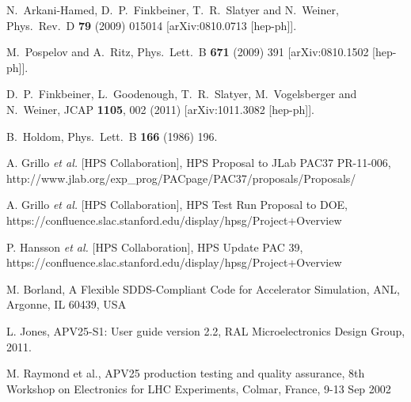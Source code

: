 \begin{thebibliography}{999}

N.~Arkani-Hamed, D.~P.~Finkbeiner, T.~R.~Slatyer and N.~Weiner,
Phys.\ Rev.\ D {\bf 79} (2009) 015014
[arXiv:0810.0713 [hep-ph]].


M.~Pospelov and A.~Ritz,
Phys.\ Lett.\ B {\bf 671} (2009) 391
[arXiv:0810.1502 [hep-ph]].

  D.~P.~Finkbeiner, L.~Goodenough, T.~R.~Slatyer, M.~Vogelsberger and N.~Weiner,
  JCAP {\bf 1105}, 002 (2011)
  [arXiv:1011.3082 [hep-ph]].

B.~Holdom,
Phys.\ Lett.\ B {\bf 166} (1986) 196.


 A. Grillo {\it et al.} [HPS Collaboration], HPS Proposal to JLab PAC37 PR-11-006,
 http://www.jlab.org/exp\_prog/PACpage/PAC37/proposals/Proposals/

 A. Grillo {\it et al.} [HPS Collaboration], HPS Test Run Proposal to DOE, 
https://confluence.slac.stanford.edu/display/hpsg/Project+Overview

 P. Hansson {\it et al.} [HPS Collaboration], HPS Update PAC 39, 
https://confluence.slac.stanford.edu/display/hpsg/Project+Overview



 
 M. Borland, A Flexible SDDS-Compliant Code for Accelerator Simulation, ANL, Argonne, IL 60439, USA
 
 
 L. Jones, APV25-S1: User guide version 2.2, RAL Microelectronics Design Group, 2011.

 M. Raymond et al., APV25 production testing and quality assurance, 8th Workshop on Electronics for LHC
	              Experiments, Colmar, France, 9-13 Sep 2002


\end{thebibliography}
